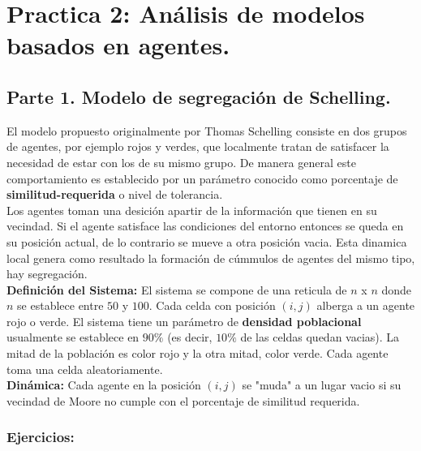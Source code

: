 \documentclass[12pt]{article}
\begin{document}

{\color{red} \section*{Practica 2: Análisis de modelos basados en agentes.}}

{\color{blue} \subsection*{Parte 1. Modelo de segregación de Schelling.}}
\vspace{1em}

El modelo propuesto originalmente por Thomas Schelling consiste en dos grupos de agentes, por ejemplo rojos y verdes, que localmente tratan de satisfacer la necesidad de estar con los
de su mismo grupo. De manera general este comportamiento es establecido por un parámetro conocido como porcentaje de \textbf{similitud-requerida} o nivel de tolerancia.\\

Los agentes toman una desición apartir de la información que tienen en su vecindad. Si el agente satisface las condiciones del entorno entonces se queda en su posición actual, de lo contrario
se mueve a otra posición vacia. Esta dinamica local genera como resultado la formación de cúmmulos de agentes del mismo tipo, hay segregación.\\

\textbf{Definición del Sistema:} El sistema se compone de una reticula de $n$ x $n$ donde $n$ se establece entre $50$ y $100$.
Cada celda con posición $(i,j)$ alberga a un agente rojo o verde. El sistema tiene un parámetro de \textbf{densidad poblacional} usualmente se establece en $90\%$ (es decir, $10\%$ de las celdas quedan vacias).
La mitad de la población es color rojo y la otra mitad, color verde. Cada agente toma una celda aleatoriamente.\\

\textbf{Dinámica:} Cada agente en la posición $(i,j)$ se "muda" a un lugar vacio si su vecindad de Moore no cumple con el porcentaje de similitud requerida.\\

{\color{blue} \subsubsection*{Ejercicios:}}
\end{document}
